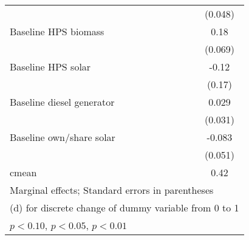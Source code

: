 \begin{table}[htbp]
\begin{tabular*}{1\hsize}{@{\hskip\tabcolsep\extracolsep\fill}l*{5}{c}}
                &                  &                  &                  &                  &  (0.048)         \\
Baseline HPS biomass&                  &                  &                  &                  &     0.18\sym{***}\\
                &                  &                  &                  &                  &  (0.069)         \\
Baseline HPS solar&                  &                  &                  &                  &    -0.12         \\
                &                  &                  &                  &                  &   (0.17)         \\
Baseline diesel generator&                  &                  &                  &                  &    0.029         \\
                &                  &                  &                  &                  &  (0.031)         \\
Baseline own/share solar&                  &                  &                  &                  &   -0.083         \\
                &                  &                  &                  &                  &  (0.051)         \\
\midrule
cmean           &                  &                  &                  &                  &     0.42         \\
\bottomrule
\multicolumn{6}{l}{\footnotesize Marginal effects; Standard errors in parentheses}\\
\multicolumn{6}{l}{\footnotesize  (d) for discrete change of dummy variable from 0 to 1}\\
\multicolumn{6}{l}{\footnotesize \sym{*} \(p<0.10\), \sym{**} \(p<0.05\), \sym{***} \(p<0.01\)}\\
\end{tabular*}
\end{table}
